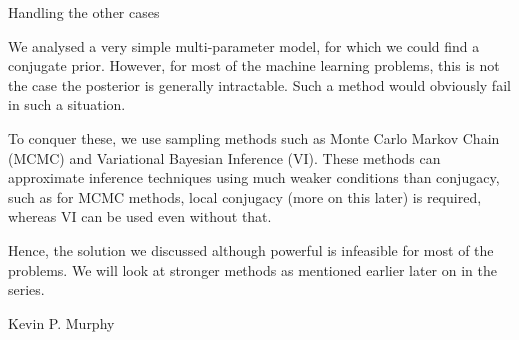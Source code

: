 \documentclass{article}
\begin{document}
\begin{ssection}{Handling the other cases}

	We analysed a very simple multi-parameter model, for which we could find a conjugate prior. However, for most of the machine learning problems, this is not the case \ie the posterior is generally intractable. Such a method would obviously fail in such a situation. \br

	To conquer these, we use sampling methods such as Monte Carlo Markov Chain (MCMC) and Variational Bayesian Inference (VI). These methods can approximate inference techniques using much weaker conditions than conjugacy, such as for MCMC methods, local conjugacy (more on this later) is required, whereas VI can be used even without that.

	Hence, the solution we discussed although powerful is infeasible for most of the problems. We will look at stronger methods as mentioned earlier later on in the series.

\end{ssection}

\vspace{10mm}
\begin{thebibliography}{10}

		Kevin P. Murphy

\end{thebibliography}
\end{document}
